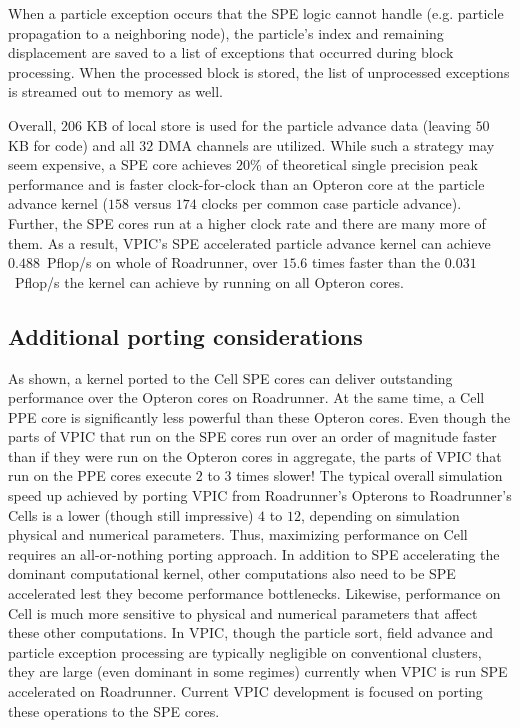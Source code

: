 \documentclass[journal,twoside]{IEEEtran}
\begin{document}
When a particle exception occurs that the SPE logic cannot handle
(e.g. particle propagation to a neighboring node), the particle's
index and remaining displacement are saved to a list of exceptions
that occurred during block processing.  When the processed block is
stored, the list of unprocessed exceptions
is streamed out to memory as well.


Overall, $206$ KB of local store is used for the particle advance data
(leaving $50$ KB for code) and all $32$ DMA channels are utilized.
While such a strategy may seem expensive, a SPE core achieves $20\%$
of theoretical single precision peak performance and is faster
clock-for-clock than an Opteron core at the particle advance kernel
($158$ versus $174$ clocks per common case particle advance).
Further, the SPE cores run at a higher clock rate and there are many
more of them.  As a result, VPIC's SPE accelerated particle advance
kernel can achieve $0.488$~Pflop/s on whole of Roadrunner, over $15.6$
times faster than the $0.031$~Pflop/s the kernel can achieve by
running on all Opteron cores.

\subsection{Additional porting considerations}

As shown, a kernel ported to the Cell SPE cores can deliver
outstanding performance over the Opteron cores on Roadrunner.  At the
same time, a Cell PPE core is significantly less powerful than these
Opteron cores.  Even though the parts of VPIC that run on the SPE
cores run over an order of magnitude faster than if they were run on
the Opteron cores in aggregate, the parts of VPIC that run on the PPE
cores execute $2$ to $3$ times slower!  The typical overall simulation
speed up achieved by porting VPIC from Roadrunner's Opterons to
Roadrunner's Cells is a lower (though still impressive) $4$ to $12$,
depending on simulation physical and numerical parameters.  Thus,
maximizing performance on Cell requires an all-or-nothing porting
approach.  In addition to SPE accelerating the dominant computational
kernel, other computations also need to be SPE accelerated lest they
become performance bottlenecks.  Likewise, performance on Cell is much
more sensitive to physical and numerical parameters that affect these
other computations.  In VPIC, though the particle sort, field advance
and particle exception processing are typically negligible on
conventional clusters, they are large (even dominant in some regimes)
currently when VPIC is run SPE accelerated on Roadrunner.  Current
VPIC development is focused on porting these operations to the SPE
cores.
\end{document}
